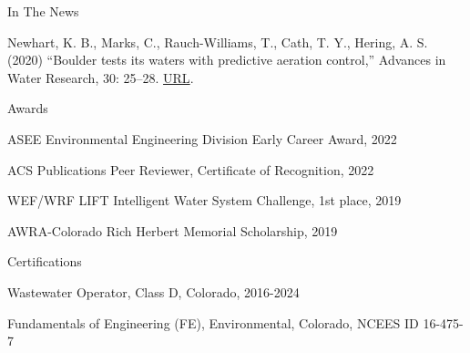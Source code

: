 \documentclass{resume} %
\begin{document}
\begin{rSection}{In The News}

Newhart, K. B., Marks, C., Rauch-Williams, T., Cath, T. Y., Hering, A. S. (2020) “Boulder tests its waters with predictive aeration control,” Advances in Water Research, 30: 25–28. \href{https://www.advancesinwaterresearch.org/awr/20200709/MobilePagedArticle.action?articleId=1621836&pm=1#articleId1621836}{URL}.
\end{rSection}



\begin{rSection}{Awards}

ASEE Environmental Engineering Division Early Career Award, 2022

ACS Publications Peer Reviewer, Certificate of Recognition, 2022

WEF/WRF LIFT Intelligent Water System Challenge, 1st place, 2019

AWRA-Colorado Rich Herbert Memorial Scholarship, 2019

\end{rSection}


\begin{rSection}{Certifications}

Wastewater Operator, Class D, Colorado, 2016-2024

Fundamentals of Engineering (FE), Environmental, Colorado, NCEES ID 16-475-7
\end{rSection}







\end{document}
